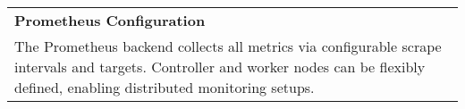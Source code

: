 \begin{table}[H]
{\begin{tabular}{
            p{3.5cm}
            >{\centering\arraybackslash}p{2cm}
            p{5cm}
            p{6cm}
            }
            \midrule
            \multicolumn{4}{l}{\textbf{Prometheus Configuration}}                                                                                                                                                                             \\[3pt]
            \multicolumn{4}{p{16.5cm}}{
                The Prometheus backend collects all metrics via configurable scrape intervals and targets. Controller and worker nodes can be flexibly defined, enabling distributed monitoring setups.
            }                                                                                                                                                                                                                                 \\

            \bottomrule
        \end{tabular}
    }
\end{table}

